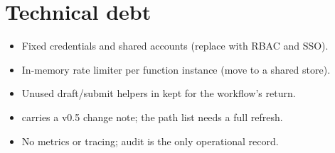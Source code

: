 \documentclass[11pt,a4paper]{article}
\begin{document}
\section{Technical debt}
\begin{itemize}
  \item Fixed credentials and shared accounts (replace with RBAC and SSO).
  \item In-memory rate limiter per function instance (move to a shared store).
  \item Unused draft/submit helpers in  kept for the workflow's return.
  \item {} carries a v0.5 change note; the path list needs a full refresh.
  \item No metrics or tracing; audit is the only operational record.
\end{itemize}
\end{document}
